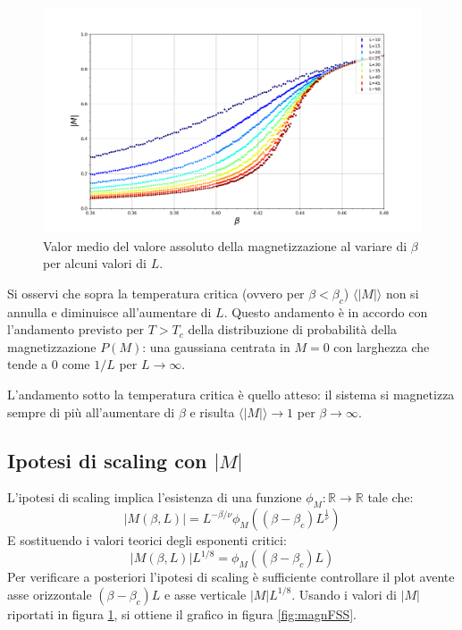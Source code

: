 \documentclass[10pt,a4paper]{article}
\begin{document}
\begin{figure}[h!]%
	\centering
	\includegraphics[width=1\linewidth]{magnass}
	\caption{Valor medio del valore assoluto della magnetizzazione al variare di $\beta$ per alcuni valori di $L$.}
	\label{fig:magnass}
\end{figure}
Si osservi che sopra la temperatura critica (ovvero per $\beta<\beta_c$) $\langle |M|\rangle$ non si annulla e diminuisce all'aumentare di $L$. Questo andamento è in accordo con l'andamento previsto per $T>T_c$ della distribuzione di probabilità della magnetizzazione $P(M)$: una gaussiana centrata in $M=0$ con larghezza che tende a $0$ come $1/L$ per $L\rightarrow\infty$. 

L'andamento sotto la temperatura critica è quello atteso: il sistema si magnetizza sempre di più all'aumentare di $\beta$ e risulta $\langle |M|\rangle\rightarrow 1$ per $\beta\rightarrow\infty$.
\subsection*{Ipotesi di scaling con $|M|$}
L'ipotesi di scaling implica l'esistenza di una funzione $\phi_M:\mathbb{R}\rightarrow\mathbb{R}$ tale che:\\
\begin{equation*}
|M(\beta,L)|= L^{-\beta/\nu}\phi_M\left((\beta-\beta_c)L^{\frac{1}{\nu}}\right)
\end{equation*}
E sostituendo i valori teorici degli esponenti critici:
\begin{equation*}
|M(\beta,L)| L^{1/8}=\phi_M\left((\beta-\beta_c)L\right)
\end{equation*}
Per verificare a posteriori l'ipotesi di scaling è sufficiente controllare il plot avente asse orizzontale $(\beta-\beta_c)L$ e asse verticale $|M| L^{1/8}$. Usando i valori di $|M|$ riportati in figura \ref{fig:magnass}, si ottiene il grafico in figura \ref{fig:magnFSS}.  
\end{document}
